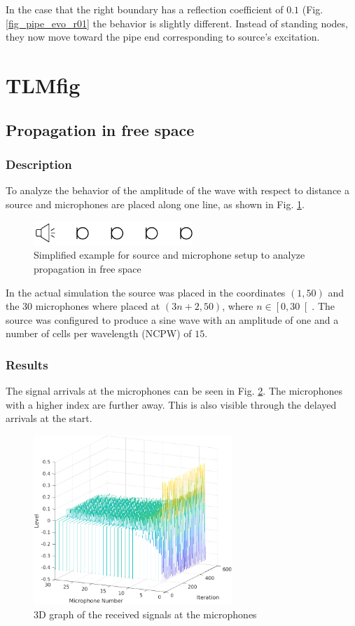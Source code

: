 \documentclass[twocolumn]{article}
\begin{document}
In the case that the right boundary has a reflection coefficient of $0.1$ (Fig. \ref{fig_pipe_evo_r01}
the behavior is slightly different.
Instead of standing nodes, they now move toward the pipe end corresponding to source's excitation.

\section{TLMfig}
\subsection{Propagation in free space}
\subsubsection{Description}
To analyze the behavior of the amplitude of the wave with respect to distance a source and
microphones are placed along one line, as shown in Fig. \ref{fig_3_1_example}.

\begin{figure}[H]
    \centering
    \includegraphics[width=60mm]{./Images/tlmfig_3_1.png}
    \caption{Simplified example for source and microphone setup to analyze propagation in free space}
    \label{fig_3_1_example}
\end{figure}

In the actual simulation the source was placed in the coordinates $\left(1,50\right)$ and
the 30 microphones where placed at $\left(3n+2,50\right)$, where $n\in\left[0,30\right[$.
The source was configured to produce a sine wave with an amplitude of one and a
number of cells per wavelength (NCPW) of $15$.

\subsubsection{Results}
The signal arrivals at the microphones can be seen in Fig. \ref{fig_3_1_3D}.
The microphones with a higher index are further away.
This is also visible through the delayed arrivals at the start.

\begin{figure}[H]
    \centering
    \includegraphics[width=75mm]{./Images/3_1_3d.png}
    \caption{3D graph of the received signals at the microphones}
    \label{fig_3_1_3D}
\end{figure}
\end{document}
